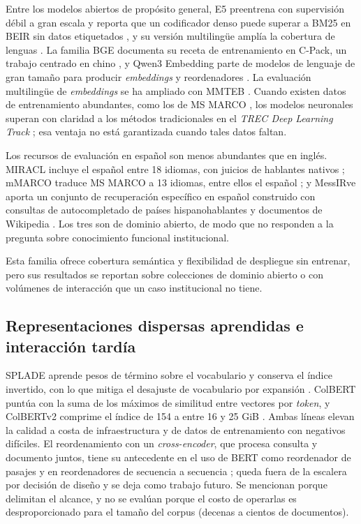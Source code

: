 \documentclass[11pt,letterpaper]{article}
\numberwithin{equation}{section}
\begin{document}
Entre los modelos abiertos de propósito general, E5 preentrena con supervisión débil a gran escala y reporta que un codificador denso puede superar a BM25 en BEIR sin datos etiquetados \cite{wang2022e5}, y su versión multilingüe amplía la cobertura de lenguas \cite{wang2024multilinguale5}. La familia BGE documenta su receta de entrenamiento en C-Pack, un trabajo centrado en chino \cite{xiao2024cpack}, y Qwen3 Embedding parte de modelos de lenguaje de gran tamaño para producir \textit{embeddings} y reordenadores \cite{zhang2025qwen3embedding}. La evaluación multilingüe de \textit{embeddings} se ha ampliado con MMTEB \cite{enevoldsen2025mmteb}. Cuando existen datos de entrenamiento abundantes, como los de MS MARCO \cite{bajaj2016msmarco}, los modelos neuronales superan con claridad a los métodos tradicionales en el \textit{TREC Deep Learning Track} \cite{craswell2020trec19dl}; esa ventaja no está garantizada cuando tales datos faltan.

Los recursos de evaluación en español son menos abundantes que en inglés. MIRACL incluye el español entre 18 idiomas, con juicios de hablantes nativos \cite{zhang2023miracl}; mMARCO traduce MS MARCO a 13 idiomas, entre ellos el español \cite{bonifacio2021mmarco}; y MessIRve aporta un conjunto de recuperación específico en español construido con consultas de autocompletado de países hispanohablantes y documentos de Wikipedia \cite{valentini2025messirve}. Los tres son de dominio abierto, de modo que no responden a la pregunta sobre conocimiento funcional institucional.

Esta familia ofrece cobertura semántica y flexibilidad de despliegue sin entrenar, pero sus resultados se reportan sobre colecciones de dominio abierto o con volúmenes de interacción que un caso institucional no tiene.

\subsection{Representaciones dispersas aprendidas e interacción tardía}
\label{sec:ea-dispersa}
SPLADE aprende pesos de término sobre el vocabulario y conserva el índice invertido, con lo que mitiga el desajuste de vocabulario por expansión \cite{formal2021splade}. ColBERT puntúa con la suma de los máximos de similitud entre vectores por \textit{token}, y ColBERTv2 comprime el índice de 154 a entre 16 y 25 GiB \cite{khattab2020colbert,santhanam2022colbertv2}. Ambas líneas elevan la calidad a costa de infraestructura y de datos de entrenamiento con negativos difíciles. El reordenamiento con un \textit{cross-encoder}, que procesa consulta y documento juntos, tiene su antecedente en el uso de BERT como reordenador de pasajes \cite{nogueira2019passage} y en reordenadores de secuencia a secuencia \cite{nogueira2020monot5}; queda fuera de la escalera por decisión de diseño y se deja como trabajo futuro. Se mencionan porque delimitan el alcance, y no se evalúan porque el costo de operarlas es desproporcionado para el tamaño del corpus (decenas a cientos de documentos).
\end{document}
